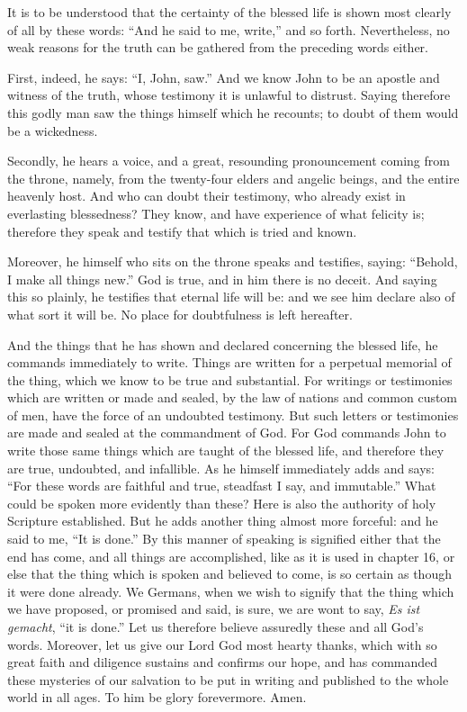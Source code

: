 It is to be understood that the certainty of the blessed life is shown most clearly of all by these words: “And he said to me, write,” and so forth. Nevertheless, no weak reasons for the truth can be gathered from the preceding words either.

First, indeed, he says: “I, John, saw.” And we know John to be an apostle and witness of the truth, whose testimony it is unlawful to distrust. Saying therefore this godly man saw the things himself which he recounts; to doubt of them would be a wickedness.

Secondly, he hears a voice, and a great, resounding pronouncement coming from the throne, namely, from the twenty-four elders and angelic beings, and the entire heavenly host. And who can doubt their testimony, who already exist in everlasting blessedness? They know, and have experience of what felicity is; therefore they speak and testify that which is tried and known.

Moreover, he himself who sits on the throne speaks and testifies, saying: “Behold, I make all things new.” God is true, and in him there is no deceit. And saying this so plainly, he testifies that eternal life will be: and we see him declare also of what sort it will be. No place for doubtfulness is left hereafter.

And the things that he has shown and declared concerning the blessed life, he commands immediately to write. Things are written for a perpetual memorial of the thing, which we know to be true and substantial. For writings or testimonies which are written or made and sealed, by the law of nations and common custom of men, have the force of an undoubted testimony. But such letters or testimonies are made and sealed at the commandment of God. For God commands John to write those same things which are taught of the blessed life, and therefore they are true, undoubted, and infallible. As he himself immediately adds and says: “For these words are faithful and true, steadfast I say, and immutable.” What could be spoken more evidently than these? Here is also the authority of holy Scripture established. But he adds another thing almost more forceful: and he said to me, “It is done.” By this manner of speaking is signified either that the end has come, and all things are accomplished, like as it is used in chapter 16, or else that the thing which is spoken and believed to come, is so certain as though it were done already. We Germans, when we wish to signify that the thing which we have proposed, or promised and said, is sure, we are wont to say, \textit{Es ist gemacht}, “it is done.” Let us therefore believe assuredly these and all God’s words. Moreover, let us give our Lord God most hearty thanks, which with so great faith and diligence sustains and confirms our hope, and has commanded these mysteries of our salvation to be put in writing and published to the whole world in all ages. To him be glory forevermore. Amen.
